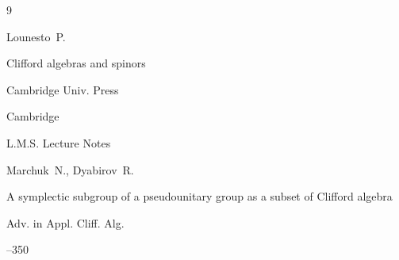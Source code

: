 \begin{thebibliography}{9}

\by Lounesto~P.

\book Clifford algebras and spinors 

\publ Cambridge Univ. Press


\publaddr Cambridge

\serial L.M.S. Lecture Notes






\by Marchuk~N.,  Dyabirov~R.

\paper A symplectic subgroup of a pseudounitary group as a subset of Clifford algebra

\jour Adv. in Appl. Cliff. Alg.




--350



\end{thebibliography}



\noindent

\hskip6.5cm \thedate \par\noindent

\hskip6.5cm\therevdate\par







\makeengtitlem





\newpage



%

